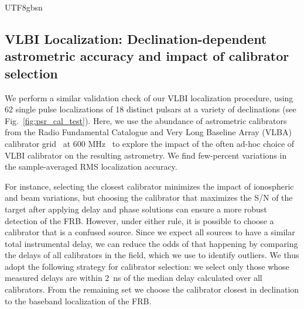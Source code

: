 \documentclass[twocolumn,linenumbers]{aastex631}
\begin{document}
\begin{CJK*}{UTF8}{gbsn}
\subsection{VLBI Localization: Declination-dependent astrometric accuracy and impact of calibrator selection}
We perform a similar validation check of our VLBI localization procedure, using 62 single pulse localizations of 18 distinct pulsars at a variety of declinations (see Fig.~\ref{fig:psr_cal_test}). Here, we use the abundance of astrometric calibrators from the Radio Fundamental Catalogue and Very Long Baseline Array (VLBA) calibrator grid~\citep{ma1998international,petrov2021wide} at 600 MHz~\citep{andrew2024vlbi} to explore the impact of the often ad-hoc choice of VLBI calibrator on the resulting astrometry. We find few-percent variations in the sample-averaged RMS localization accuracy. 

For instance, selecting the closest calibrator minimizes the impact of ionospheric and beam variations, but choosing the calibrator that maximizes the S/N of the target after applying delay and phase solutions can ensure a more robust detection of the FRB. However, under either rule, it is possible to choose a calibrator that is a confused source. Since we expect all sources to have a similar total instrumental delay, we can reduce the odds of that happening by comparing the delays of all calibrators in the field, which we use to identify outliers. We thus adopt the following strategy for calibrator selection: we select only those whose measured delays are within 2~ns of the median delay calculated over all calibrators. From the remaining set we choose the calibrator closest in declination to the baseband localization of the FRB.


\end{CJK*}
\end{document}
